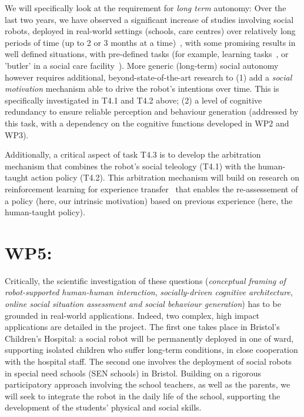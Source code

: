 \documentclass[11pt,a4paper]{report}
\begin{document}
We will specifically look at the requirement for \emph{long term} autonomy: Over
the last two years, we have observed a significant increase of studies
involving social robots, deployed in real-world settings (schools, care centres)
over relatively long periods of time (up to 2 or 3 months at a
time)~\cite{kunze2018artificial,leite2013social}, with some promising results
in well defined situations, with pre-defined tasks (for example, learning
tasks~\cite{senft2019teaching}, or 'butler' in a social care
facility~\cite{hawes2017strands}). More generic (long-term) social autonomy
however requires additional, beyond-state-of-the-art research to (1) add a
\emph{social motivation} mechanism able to drive the robot's intentions over
time. This is specifically investigated in T4.1 and T4.2 above; (2) a level of
cognitive redundancy to ensure reliable perception and behaviour generation
(addressed by this task, with a dependency on the cognitive functions developed
in WP2 and WP3).

Additionally, a critical aspect of task T4.3 is to develop the arbitration
mechanism that combines the robot's social teleology (T4.1) with the human-taught
action policy (T4.2). This arbitration mechanism will build on research on
reinforcement learning for experience transfer~\cite{madden2004transfer} that
enables the re-assessement of a policy (here, our intrinsic motivation) based on
previous experience (here, the human-taught policy).




\section{WP5: \textbf{\wpFive}}

\noindent{}





Critically, the scientific investigation of these questions (\emph{conceptual
framing of robot-supported human-human interaction}, \emph{socially-driven
cognitive architecture},  \emph{online social situation assessment and social
behaviour generation}) has to be
grounded in real-world applications. Indeed, two complex, high impact
applications are detailed in the project. The first one takes place in
Bristol's Children's Hospital: a social robot will be permanently deployed in one
of ward, supporting isolated children who suffer long-term conditions, in close
cooperation with the hospital staff. The second one involves the deployment of 
social robots in special need schools (SEN schools) in Bristol. Building on a
rigorous participatory approach involving the school teachers, as well as the
parents, we will seek to integrate the robot in the daily life of the school,
supporting the development of the students' physical and social skills.
\end{document}
